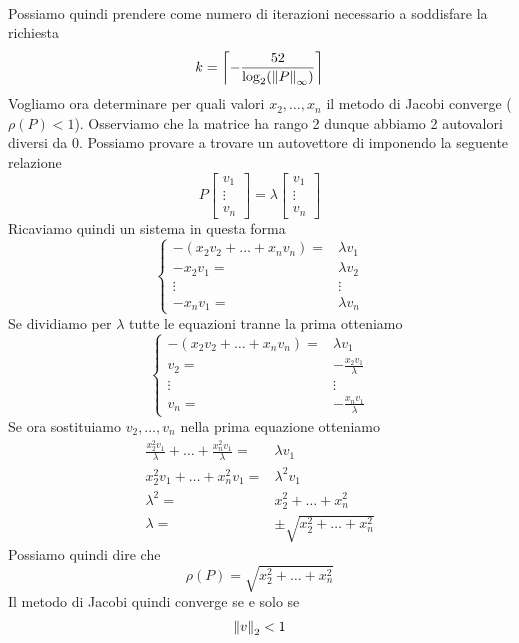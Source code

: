 \begin{example}
\begin{align*}
	\end{align*}
	Possiamo quindi prendere come numero di iterazioni necessario a soddisfare la richiesta
	\[ k = \left\lceil -\frac{52}{\log_2 (\left\lVert P\right\rVert_\infty)} \right\rceil \]
	Vogliamo ora determinare per quali valori $x_2, \dots, x_n$ il metodo di Jacobi converge ($\rho (P) < 1$).
	Osserviamo che la matrice ha rango 2 dunque abbiamo 2 autovalori diversi da 0. Possiamo provare a trovare un
	autovettore di imponendo la seguente relazione
	\[
		P \begin{bmatrix} v_1 \\ \vdots \\ v_n \end{bmatrix} =
		\lambda \begin{bmatrix} v_1 \\ \vdots \\ v_n \end{bmatrix}
	\]
	Ricaviamo quindi un sistema in questa forma
	\[
		\begin{cases}
			- (x_2 v_2 + \dots + x_n v_n) = & \lambda v_1 \\
			-x_2 v_1 =                      & \lambda v_2 \\
			\vdots                          & \vdots      \\
			-x_n v_1 =                      & \lambda v_n
		\end{cases}
	\]
	Se dividiamo per $\lambda$ tutte le equazioni tranne la prima otteniamo
	\[
		\begin{cases}
			- (x_2 v_2 + \dots + x_n v_n) = & \lambda v_1              \\
			v_2 =                           & -\frac{x_2 v_1}{\lambda} \\
			\vdots                          & \vdots                   \\
			v_n =                           & -\frac{x_n v_1}{\lambda}
		\end{cases}
	\]
	Se ora sostituiamo $v_2, \dots, v_n$ nella prima equazione otteniamo
	\begin{align*}
		\frac{x_2^2 v_1}{\lambda} + \dots + \frac{x_n^2 v_1}{\lambda} = & \lambda v_1                      \\
		x_2^2 v_1 + \dots + x_n^2 v_1 =                                 & \lambda^2 v_1                    \\
		\lambda^2 =                                                     & x_2^2 + \dots + x_n^2            \\
		\lambda =                                                       & \pm \sqrt{x_2^2 + \dots + x_n^2}
	\end{align*}
	Possiamo quindi dire che
	\[ \rho(P) = \sqrt{x_2^2 + \dots + x_n^2} \]
	Il metodo di Jacobi quindi converge se e solo se
	\[ \left\lVert v\right\rVert_2 < 1 \]
\end{example}